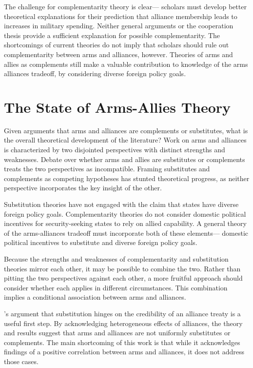 \documentclass[12pt]{article}
\begin{document}
The challenge for complementarity theory is clear--- scholars must develop better theoretical explanations for their prediction that alliance membership leads to increases in military spending. Neither general arguments or the cooperation thesis provide a sufficient explanation for possible complementarity. The shortcomings of current theories do not imply that scholars should rule out complementarity between arms and alliances, however. Theories of arms and allies as complements still make a valuable contribution to knowledge of the arms alliances tradeoff, by considering diverse foreign policy goals. 


\section*{The State of Arms-Allies Theory}

Given arguments that arms and alliances are complements or substitutes, what is the overall theoretical development of the literature? Work on arms and alliances is characterized by two disjointed perspectives with distinct strengths and weaknesses. Debate over whether arms and allies are substitutes or complements treats the two perspectives as incompatible. Framing substitutes and complements as competing hypotheses has stunted theoretical progress, as neither perspective incorporates the key insight of the other. 

Substitution theories have not engaged with the claim that states have diverse foreign policy goals. Complementarity theories do not consider domestic political incentives for security-seeking states to rely on allied capability. A general theory of the arms-alliances tradeoff must incorporate both of these elements--- domestic political incentives to substitute and diverse foreign policy goals. 

Because the strengths and weaknesses of complementarity and substitution theories mirror each other, it may be possible to combine the two. Rather than pitting the two perspectives against each other, a more fruitful approach should consider whether each applies in different circumstances. This combination implies a conditional association between arms and alliances. 

\citet{DigiuseppePoast2016}'s argument that substitution hinges on the credibility of an alliance treaty is a useful first step. By acknowledging heterogeneous effects of alliances, the theory and results suggest that arms and alliances are not uniformly substitutes or complements. The main shortcoming of this work is that while it acknowledges findings of a positive correlation between arms and alliances, it does not address those cases. 
\end{document}
